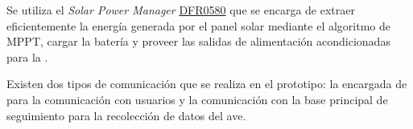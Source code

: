 Se utiliza el \textit{Solar Power Manager} \href{https://wiki.dfrobot.com/Solar_Power_Manager_For_12V_Lead-Acid_Battery_SKU__DFR0580}{DFR0580} que se encarga de extraer eficientemente la energía generada por el panel solar mediante el algoritmo de MPPT, cargar la batería y proveer las salidas de alimentación acondicionadas para la \rpi.

Existen dos tipos de comunicación que se realiza en el prototipo: la encargada de \nodered para la comunicación con usuarios y la comunicación con la base principal de seguimiento para la recolección de datos del ave.
